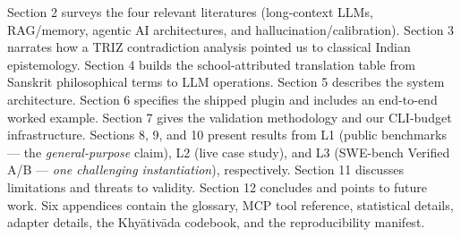 Section 2 surveys the four relevant literatures (long-context LLMs, RAG/memory, agentic AI architectures, and hallucination/calibration). Section 3 narrates how a TRIZ contradiction analysis pointed us to classical Indian epistemology. Section 4 builds the school-attributed translation table from Sanskrit philosophical terms to LLM operations. Section 5 describes the system architecture. Section 6 specifies the shipped plugin and includes an end-to-end worked example. Section 7 gives the validation methodology and our CLI-budget infrastructure. Sections 8, 9, and 10 present results from L1 (public benchmarks --- the \emph{general-purpose} claim), L2 (live case study), and L3 (SWE-bench Verified A/B --- \emph{one challenging instantiation}), respectively. Section 11 discusses limitations and threats to validity. Section 12 concludes and points to future work. Six appendices contain the glossary, MCP tool reference, statistical details, adapter details, the Khyātivāda codebook, and the reproducibility manifest.
